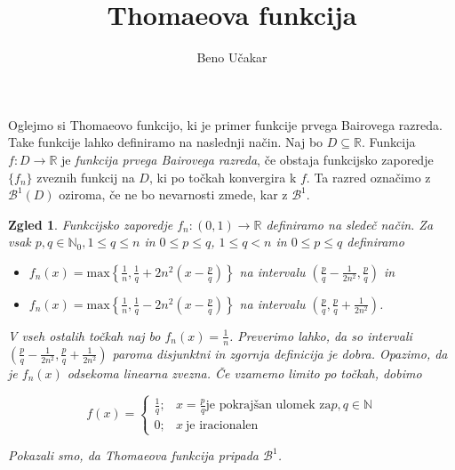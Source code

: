 \documentclass[a4paper,12pt]{article}
\title{Thomaeova funkcija}
\author{Beno Učakar}
\date{}
\def\R{\mathbb{R}}  %
\newtheorem{zgled}{Zgled}}
\newcommand{\B}{\mathscr{B}^1}
\begin{document}
\maketitle

Oglejmo si Thomaeovo funkcijo, ki je primer funkcije prvega Bairovega razreda\cite{counterexamples}.
Take funkcije lahko definiramo na naslednji način.
Naj bo $D\subseteq\R$. Funkcija $f:D \rightarrow \R$ je \emph{funkcija prvega Bairovega razreda}, 
če obstaja funkcijsko zaporedje $\{f_n\}$ zveznih funkcij na $D$, ki po točkah konvergira k $f$. 
Ta razred označimo z $\B(D)$ oziroma, če ne bo nevarnosti zmede, kar z $\B$.

\begin{zgled}
    Funkcijsko zaporedje $f_n: (0,1)\rightarrow \R$ definiramo na sledeč način.
    Za vsak $p,q \in \mathbb{N}_0, 1 \leq q \leq n$ in $0 \leq p \leq q$, $1 \le q < n$ in $0 \le p \le q$ definiramo
    \begin{itemize}
        \item \(f_n(x) = \text{max}\left\{\frac{1}{n}, \frac{1}{q} + 2n^2\left(x - \frac{p}{q}\right)\right\}\) na intervalu \(\left(\frac{p}{q} - \frac{1}{2n^2}, \frac{p}{q}\right)\) in
        \item \(f_n(x) = \text{max}\left\{\frac{1}{n}, \frac{1}{q} - 2n^2\left(x - \frac{p}{q}\right)\right\}\) na intervalu \(\left(\frac{p}{q}, \frac{p}{q} + \frac{1}{2n^2}\right)\).
    \end{itemize}
    V vseh ostalih točkah naj bo $f_n(x) = \frac{1}{n}$.
    Preverimo lahko, da so intervali $\left(\frac{p}{q} - \frac{1}{2n^2}, \frac{p}{q} + \frac{1}{2n^2}\right)$ paroma disjunktni in zgornja definicija je dobra.
    Opazimo, da je $f_n(x)$ odsekoma linearna zvezna. Če vzamemo limito po točkah, dobimo

    \[f(x)=
    \begin{cases}
        \frac{1}{q}; & x=\frac{p}{q} \text{je pokrajšan ulomek za} p,q\in\mathbb{N}\\
        0; & x ~ \text{je iracionalen}
    \end{cases}\]

    Pokazali smo, da \emph{Thomaeova funkcija} pripada $\B$. 
\end{zgled}




\end{document}
